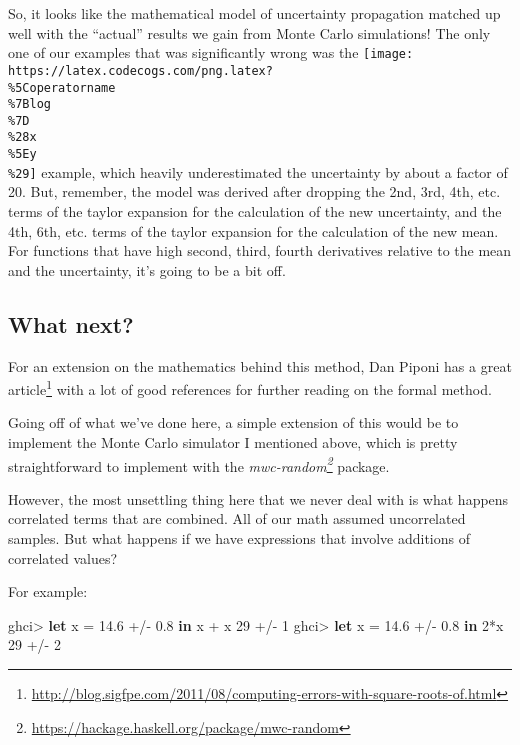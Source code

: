 \documentclass[]{article}
\newenvironment{Shaded}{}{}
\newcommand{\DecValTok}[1]{\textcolor[rgb]{0.25,0.63,0.44}{#1}}
\newcommand{\FloatTok}[1]{\textcolor[rgb]{0.25,0.63,0.44}{#1}}
\newcommand{\KeywordTok}[1]{\textcolor[rgb]{0.00,0.44,0.13}{\textbf{#1}}}
\newcommand{\NormalTok}[1]{#1}
\newcommand{\OperatorTok}[1]{\textcolor[rgb]{0.40,0.40,0.40}{#1}}
\newcommand{\OtherTok}[1]{\textcolor[rgb]{0.00,0.44,0.13}{#1}}
\renewcommand{\href}[2]{#2\footnote{\url{#1}}}
\begin{document}
So, it looks like the mathematical model of uncertainty propagation matched up
well with the ``actual'' results we gain from Monte Carlo simulations! The only
one of our examples that was significantly wrong was the
\texttt{[image: https://latex.codecogs.com/png.latex?\\\%5Coperatorname\\\%7Blog\\\%7D\\\%28x\\\%5Ey\\\%29]}
example, which heavily underestimated the uncertainty by about a factor of 20.
But, remember, the model was derived after dropping the 2nd, 3rd, 4th, etc.
terms of the taylor expansion for the calculation of the new uncertainty, and
the 4th, 6th, etc. terms of the taylor expansion for the calculation of the new
mean. For functions that have high second, third, fourth derivatives relative to
the mean and the uncertainty, it's going to be a bit off.

\hypertarget{what-next}{%
\subsection{What next?}\label{what-next}}

For an extension on the mathematics behind this method, Dan Piponi has a
\href{http://blog.sigfpe.com/2011/08/computing-errors-with-square-roots-of.html}{great
article} with a lot of good references for further reading on the formal method.

Going off of what we've done here, a simple extension of this would be to
implement the Monte Carlo simulator I mentioned above, which is pretty
straightforward to implement with the
\emph{\href{https://hackage.haskell.org/package/mwc-random}{mwc-random}}
package.

However, the most unsettling thing here that we never deal with is what happens
correlated terms that are combined. All of our math assumed uncorrelated
samples. But what happens if we have expressions that involve additions of
correlated values?

For example:

\begin{Shaded}
\begin{Highlighting}[]
\NormalTok{ghci}\OperatorTok{>} \KeywordTok{let}\NormalTok{ x }\OtherTok{=} \FloatTok{14.6} \OperatorTok{+/{-}} \FloatTok{0.8} \KeywordTok{in}\NormalTok{ x }\OperatorTok{+}\NormalTok{ x}
\DecValTok{29} \OperatorTok{+/{-}} \DecValTok{1}
\NormalTok{ghci}\OperatorTok{>} \KeywordTok{let}\NormalTok{ x }\OtherTok{=} \FloatTok{14.6} \OperatorTok{+/{-}} \FloatTok{0.8} \KeywordTok{in} \DecValTok{2}\OperatorTok{*}\NormalTok{x}
\DecValTok{29} \OperatorTok{+/{-}} \DecValTok{2}
\end{Highlighting}
\end{Shaded}
\end{document}
